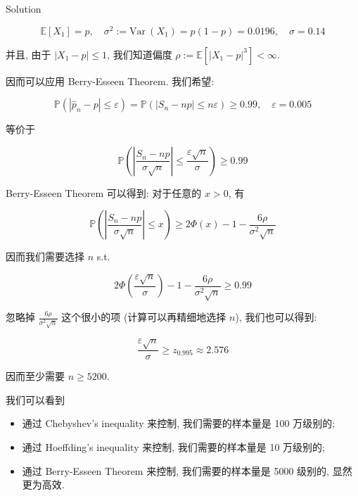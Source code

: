 \begin{qlsolution}{Solution}
\begin{itemize}
  \[\mathbb{E}\left\lbrack \mathit{X}_{1} \right\rbrack = \mathit{p},\quad\mathit{\sigma}^{2} := \text{Var}\ \left( \mathit{X}_{1} \right) = \mathit{p}(1 - \mathit{p}) = 0.0196,\quad\mathit{\sigma} = 0.14\]

  并且, 由于 \(\left| {\mathit{X}_{1} - \mathit{p}} \right| \leq 1\), 我们知道偏度 \(\mathit{\rho} := \mathbb{E}\left\lbrack \left| {\mathit{X}_{1} - \mathit{p}} \right|^{3} \right\rbrack < \infty\).

  因而可以应用 Berry-Esseen Theorem. 我们希望:

  \[\mathbb{P}\left( {\left| {{\widehat{\mathit{p}}}_{\mathit{n}} - \mathit{p}} \right| \leq \mathit{\varepsilon}} \right) = \mathbb{P}\left( {\left| {\mathit{S}_{\mathit{n}} - \mathit{n}\mathit{p}} \right| \leq \mathit{n}\mathit{\varepsilon}} \right) \geq 0.99,\quad\mathit{\varepsilon} = 0.005\]

  等价于

  \[\mathbb{P}\left( {\left| \frac{\mathit{S}_{\mathit{n}} - \mathit{n}\mathit{p}}{\mathit{\sigma}\sqrt{\mathit{n}}} \right| \leq \frac{\mathit{\varepsilon}\sqrt{\mathit{n}}}{\mathit{\sigma}}} \right) \geq 0.99\]

  Berry-Esseen Theorem 可以得到: 对于任意的 \(\mathit{x} > 0\), 有

  \[\mathbb{P}\left( {\left| \frac{\mathit{S}_{\mathit{n}} - \mathit{n}\mathit{p}}{\mathit{\sigma}\sqrt{\mathit{n}}} \right| \leq \mathit{x}} \right) \geq 2\Phi(\mathit{x}) - 1 - \frac{6\mathit{\rho}}{\mathit{\sigma}^{2}\sqrt{\mathit{n}}}\]

  因而我们需要选择 \(\mathit{n}\) s.t.

  \[2\Phi\left( \frac{\mathit{\varepsilon}\sqrt{\mathit{n}}}{\mathit{\sigma}} \right) - 1 - \frac{6\mathit{\rho}}{\mathit{\sigma}^{2}\sqrt{\mathit{n}}} \geq 0.99\]

  忽略掉 \(\frac{6\mathit{\rho}}{\mathit{\sigma}^{2}\sqrt{\mathit{n}}}\) 这个很小的项 (计算可以再精细地选择 \(\mathit{n}\)), 我们也可以得到:

  \[\frac{\mathit{\varepsilon}\sqrt{\mathit{n}}}{\mathit{\sigma}} \geq \mathit{z}_{0.995} \approx 2.576\]

  因而至少需要 \(\mathit{n} \geq 5200\).
\end{itemize}

我们可以看到

\begin{itemize}
\item
  通过 Chebyshev's inequality 来控制, 我们需要的样本量是 100 万级别的;
\item
  通过 Hoeffding's inequality 来控制, 我们需要的样本量是 10 万级别的;
\item
  通过 Berry-Esseen Theorem 来控制, 我们需要的样本量是 5000 级别的, 显然更为高效.
\end{itemize}


\end{qlsolution}
